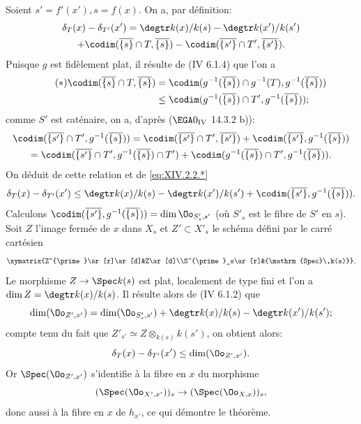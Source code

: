 Soient $s'=f'(x'), s=f(x)$. On a, par d\'efinition:
\begin{multline*}
\delta_T(x)-\delta_{T'}(x')=\degtr k(x)/k(s)-\degtr k(x')/k(s')\\
+\codim(\overline{\{s\}}\cap T, \overline{\{s\}})-\codim(\overline{\{s'\}}\cap T', \overline{\{s'\}}).
\end{multline*}
Puisque $g$ est fid\`element plat, il r\'esulte de (\EGA IV 6.1.4) que l'on a
\begin{align*} \label{eq:XIV.2.2.*} \tag{$*$}
\codim(\overline{\{s\}}\cap T, \overline{\{s\}})&=\codim(g^{-1}(\overline{\{s\}})\cap g^{-1}(T), g^{-1}(\overline{\{s\}}))\\&\leq\codim(g^{-1}(\overline{\{s\}})\cap T', g^{-1}(\overline{\{s\}}));
\end{align*}
comme $S'$ est cat\'enaire, on a, d'apr\`es ($\EGA 0_{\textup{IV}}$ 14.3.2 b)):
\begin{multline*}
\codim(\overline{\{s'\}}\cap T', g^{-1}(\overline{\{s\}}))= \codim(\overline{\{s'\}}\cap T', \overline{\{s'\}})+ \codim(\overline{\{s'\}}, g^{-1}(\overline{\{s\}}))\\
= \codim(\overline{\{s'\}}\cap T', g^{-1}(\overline{\{s\}})\cap T')+ \codim(g^{-1}(\overline{\{s\}})\cap T', g^{-1}(\overline{\{s\}})).
\end{multline*}
On d\'eduit de cette relation et de \eqref{eq:XIV.2.2.*}
$$
\delta_T(x)-\delta_{T'}(x')\leq\degtr k(x)/k(s)-\degtr k(x')/k(s')+\codim(\overline{\{s'\}}, g^{-1}(\overline{\{s\}})).
$$
Calculons $\codim(\overline{\{s'\}}, g^{-1}(\overline{\{s\}}))=\dim\Oo_{S'_s, s'}$ (o\`u $S'_s$ est le fibre de $S'$ en $s$). Soit $Z$ l'image ferm\'ee de $x$ dans $X_s$ et $Z'\subset X'_s$ le sch\'ema d\'efini par le carr\'e cart\'esien
$$
\xymatrix{Z^{\prime}\ar[r]\ar[d]&Z\ar[d]\\S^{\prime}_s\ar[r]&{\mathrm{Spec}\,k(s)}}.
$$
Le morphisme $Z\to \Spec k(s)$ est plat, localement de type fini et l'on a $\dim Z=\degtr k(x)/k(s)$. Il r\'esulte alors de (\EGA IV 6.1.2) que
$$
\dim(\Oo_{Z', x'})=\dim(\Oo_{S'_s, s'})+\degtr k(x)/k(s)-\degtr k(x')/k(s');$$
compte tenu du fait que $Z'_{s'}\simeq Z\otimes_{k(s)}k(s')$, on obtient alors:
$$
\delta_T(x)-\delta_{T'}(x')\leq\dim(\Oo_{Z', x'}).
$$
Or $\Spec(\Oo_{Z', x'})$ s'identifie \`a la fibre en $x$ du morphisme
$$(\Spec(\Oo_{X', x'}))_s\to(\Spec(\Oo_{X, x}))_s,
$$
donc aussi \`a la fibre en $x$ de $h_{x'}$, ce qui d\'emontre le th\'eor\`eme.

